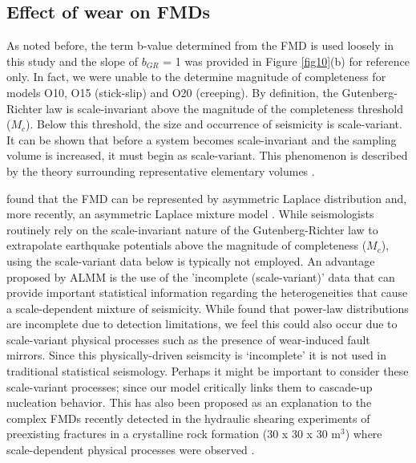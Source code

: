 \documentclass[preprint,1p, 10pt,authoryear]{elsarticle}
\begin{document}
\subsection{Effect of wear on FMDs}
As noted before, the term b-value determined from the FMD is used loosely in this study and the slope of $b_{GR}$ = 1 was provided in Figure \ref{fig10}(b) for reference only. In fact, we were unable to the determine magnitude of completeness for models O10, O15 (stick-slip) and O20 (creeping). By definition, the Gutenberg-Richter law is scale-invariant above the magnitude of the completeness threshold ($M_{c}$). Below this threshold, the size and occurrence of seismicity is scale-variant. It can be shown that before a system becomes scale-invariant and the sampling volume is increased, it must begin as scale-variant. This phenomenon is described by the theory surrounding representative elementary volumes \citep{Hill1963}.

\citet{Mignan2012} found that the FMD can be represented by asymmetric Laplace distribution and, more recently, an asymmetric Laplace mixture model \citep[ALMM, ][]{Mignan2020}. While seismologists routinely rely on the scale-invariant nature of the Gutenberg-Richter law to extrapolate earthquake potentials above the magnitude of completeness ($M_{c}$), using the scale-variant data below is typically not employed. An advantage proposed by ALMM is the use of the 'incomplete (scale-variant)' data that can provide important statistical information regarding the heterogeneities that cause a scale-dependent mixture of seismicity. While \citet{Mignan2020} found that power-law distributions are incomplete due to detection limitations, we feel this could also occur due to scale-variant physical processes such as the presence of wear-induced fault mirrors. Since this physically-driven seismcity is `incomplete' it is not used in traditional statistical seismology. Perhaps it might be important to consider these scale-variant processes; since our model critically links them to cascade-up nucleation behavior. This has also been proposed as an explanation to the complex FMDs recently detected in the hydraulic shearing experiments of preexisting fractures in a crystalline rock formation (30 x 30 x 30 m$^{3}$) where scale-dependent physical processes were observed \citep{Villiger2019}.
\end{document}
